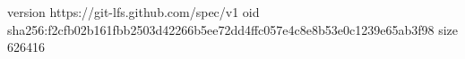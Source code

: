 version https://git-lfs.github.com/spec/v1
oid sha256:f2cfb02b161fbb2503d42266b5ee72dd4ffc057e4c8e8b53e0c1239e65ab3f98
size 626416
